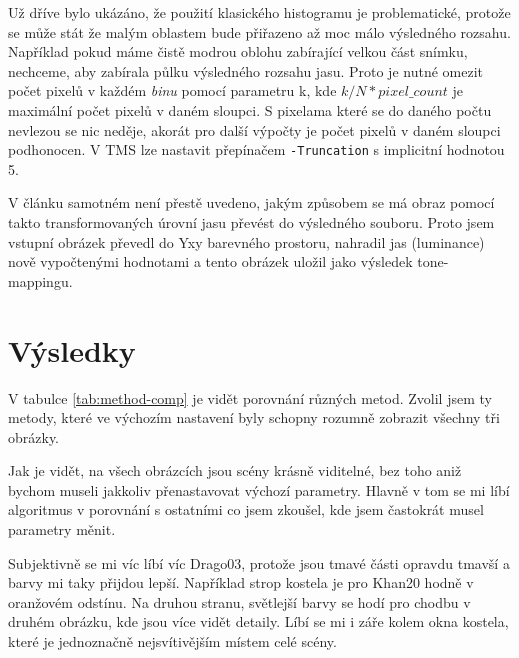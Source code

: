 \documentclass[11pt,a4paper,oneside]{article}
\begin{document}
Už dříve bylo ukázáno, že použití klasického histogramu je problematické,
protože se může stát že malým oblastem bude přiřazeno až moc málo výsledného
rozsahu. Například pokud máme čistě modrou oblohu zabírající velkou část snímku,
nechceme, aby zabírala půlku výsledného rozsahu jasu. Proto je nutné
omezit počet pixelů v každém \textit{binu} pomocí parametru k, kde
$k/N*pixel\_count$ je maximální počet pixelů v daném sloupci. S pixelama které
se do daného počtu nevlezou se nic neděje, akorát pro další výpočty je počet
pixelů v daném sloupci podhonocen. V TMS lze nastavit přepínačem
\texttt{-Truncation} s implicitní hodnotou 5.

V článku samotném není přestě uvedeno, jakým způsobem se má obraz pomocí takto
transformovaných úrovní jasu převést do výsledného souboru. Proto jsem vstupní
obrázek převedl do Yxy barevného prostoru, nahradil jas (luminance) nově
vypočtenými hodnotami a tento obrázek uložil jako výsledek tone-mappingu.

\section{Výsledky}


V tabulce \ref{tab:method-comp} je vidět porovnání různých metod. Zvolil jsem ty
metody, které ve výchozím nastavení byly schopny rozumně zobrazit všechny tři
obrázky.

Jak je vidět, na všech obrázcích jsou scény krásně viditelné, bez toho aniž
bychom museli jakkoliv přenastavovat výchozí parametry. Hlavně v tom
se mi líbí algoritmus v porovnání s ostatními co jsem zkoušel, kde jsem
častokrát musel parametry měnit.

Subjektivně se mi víc líbí víc Drago03, protože jsou tmavé části opravdu tmavší
a barvy mi taky přijdou lepší. Například strop kostela je pro Khan20 hodně
v oranžovém odstínu. Na druhou stranu, světlejší barvy se hodí pro chodbu v
druhém obrázku, kde jsou více vidět detaily. Líbí se mi i záře kolem okna
kostela, které je jednoznačně nejsvítivějším místem celé scény.
\end{document}
